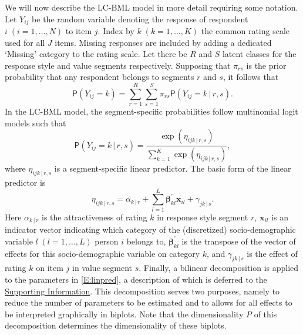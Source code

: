 \documentclass[12pt,letter]{article}\usepackage[]{graphicx}\usepackage[]{xcolor}
\newcommand{\vect}[1]{\boldsymbol{#1}}  %
\newcommand{\Prob}{\mathsf{P}}
\begin{document}
We will now describe the LC-BML model in more detail requiring some notation. Let $Y_{ij}$ be the random variable denoting the response of respondent $i \; (i = 1, \ldots, N)$ to item $j$. Index by $k \; (k = 1, \ldots, K)$ the common rating scale used for all $J$ items. Missing responses are included by adding a dedicated `Missing' category to the rating scale. Let there be $R$ and $S$ latent classes for the response style and value segments respectively. Supposing that $\pi_{rs}$ is the prior probability that any respondent belongs to segments $r$ and $s$, it follows that
\begin{equation}
  \Prob (Y_{ij} = k)  = \sum_{r=1}^{R} \sum_{s=1}^{S} \pi_{rs} \Prob (Y_{ij} = k \, | \, r, s).
\end{equation}
In the LC-BML model, the segment-specific probabilities follow multinomial logit models such that
\begin{equation}
  \Prob (Y_{ij} = k \, | \, r, s) = 
    \frac{\exp \left( \eta_{ijk \, | \, r, s} \right)}
         {\sum_{k = 1}^{K} \exp \left( \eta_{ijk \, | \, r, s}  \right)},
\end{equation}
where $\eta_{ijk \, | \, r, s}$ is a segment-specific linear predictor. The basic form of the linear predictor is 
\begin{equation}
  \eta_{ijk \, | \, r, s} = \alpha_{k \, | \, r} + \sum_{l=1}^{L} \vect{\beta}_{kl}^{'} \vect{x}_{il}
    + \gamma_{jk \, | \, s}.
    \label{E:linpred}
\end{equation}
Here $\alpha_{k \, | \, r}$ is the attractiveness of rating $k$ in response style segment $r$, $\vect{x}_{il}$ is an indicator vector indicating which category of the (discretized) socio-demographic variable $l \; (l = 1, \ldots, L)$ person $i$ belongs to, $\vect{\beta}_{kl}^{'}$ is the transpose of the vector of effects for this socio-demographic variable on category $k$, and $\gamma_{jk \, | \, s}$ is the effect of rating $k$ on item $j$ in value segment $s$. Finally, a bilinear decomposition is applied to the parameters in \eqref{E:linpred}, a description of which is deferred to the \hyperref[S:App]{Supporting Information}. This decomposition serves two purposes, namely to reduce the number of parameters to be estimated and to allows for all effects to be interpreted graphically in biplots. Note that the dimensionality $P$ of this decomposition determines the dimensionality of these biplots. 
\end{document}
